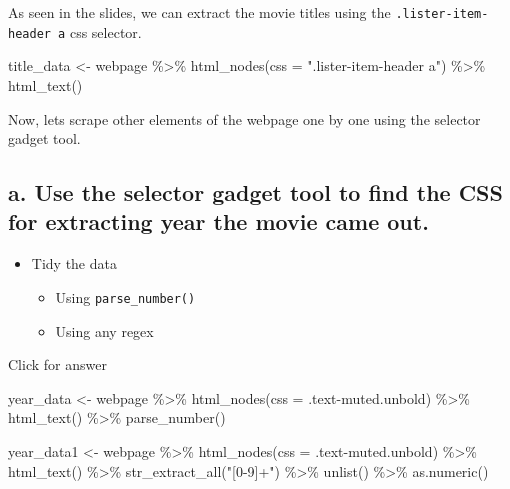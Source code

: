 \documentclass[
]{book}
\newenvironment{Shaded}{\begin{snugshade}}{\end{snugshade}}
\newcommand{\AttributeTok}[1]{\textcolor[rgb]{0.77,0.63,0.00}{#1}}
\newcommand{\FunctionTok}[1]{\textcolor[rgb]{0.00,0.00,0.00}{#1}}
\newcommand{\NormalTok}[1]{#1}
\newcommand{\OtherTok}[1]{\textcolor[rgb]{0.56,0.35,0.01}{#1}}
\newcommand{\SpecialCharTok}[1]{\textcolor[rgb]{0.00,0.00,0.00}{#1}}
\newcommand{\StringTok}[1]{\textcolor[rgb]{0.31,0.60,0.02}{#1}}
\providecommand{\tightlist}{%
  \setlength{\itemsep}{0pt}\setlength{\parskip}{0pt}}
\begin{document}
As seen in the slides, we can extract the movie titles using the \texttt{.lister-item-header\ a} css selector.

\begin{Shaded}
\begin{Highlighting}[]
\NormalTok{title\_data }\OtherTok{\textless{}{-}}\NormalTok{ webpage }\SpecialCharTok{\%\textgreater{}\%} 
  \FunctionTok{html\_nodes}\NormalTok{(}\AttributeTok{css =} \StringTok{".lister{-}item{-}header a"}\NormalTok{) }\SpecialCharTok{\%\textgreater{}\%} 
  \FunctionTok{html\_text}\NormalTok{()}
\end{Highlighting}
\end{Shaded}

Now, lets scrape other elements of the webpage one by one using the selector gadget tool.

\hypertarget{a.-use-the-selector-gadget-tool-to-find-the-css-for-extracting-year-the-movie-came-out.}{%
\subsection{a. Use the selector gadget tool to find the CSS for extracting year the movie came out.}\label{a.-use-the-selector-gadget-tool-to-find-the-css-for-extracting-year-the-movie-came-out.}}

\begin{itemize}
\tightlist
\item
  Tidy the data

  \begin{itemize}
  \tightlist
  \item
    Using \texttt{parse\_number()}
  \item
    Using any regex
  \end{itemize}
\end{itemize}

Click for answer

\begin{Shaded}
\begin{Highlighting}[]
\NormalTok{year\_data }\OtherTok{\textless{}{-}}\NormalTok{ webpage }\SpecialCharTok{\%\textgreater{}\%} 
  \FunctionTok{html\_nodes}\NormalTok{(}\AttributeTok{css =} \StringTok{\textquotesingle{}.text{-}muted.unbold\textquotesingle{}}\NormalTok{) }\SpecialCharTok{\%\textgreater{}\%} 
  \FunctionTok{html\_text}\NormalTok{() }\SpecialCharTok{\%\textgreater{}\%}
  \FunctionTok{parse\_number}\NormalTok{()}

\NormalTok{year\_data1 }\OtherTok{\textless{}{-}}\NormalTok{ webpage }\SpecialCharTok{\%\textgreater{}\%} 
  \FunctionTok{html\_nodes}\NormalTok{(}\AttributeTok{css =} \StringTok{\textquotesingle{}.text{-}muted.unbold\textquotesingle{}}\NormalTok{) }\SpecialCharTok{\%\textgreater{}\%} 
  \FunctionTok{html\_text}\NormalTok{() }\SpecialCharTok{\%\textgreater{}\%} 
  \FunctionTok{str\_extract\_all}\NormalTok{(}\StringTok{"[0{-}9]+"}\NormalTok{) }\SpecialCharTok{\%\textgreater{}\%} 
  \FunctionTok{unlist}\NormalTok{() }\SpecialCharTok{\%\textgreater{}\%} 
  \FunctionTok{as.numeric}\NormalTok{()}
\end{Highlighting}
\end{Shaded}
\end{document}
